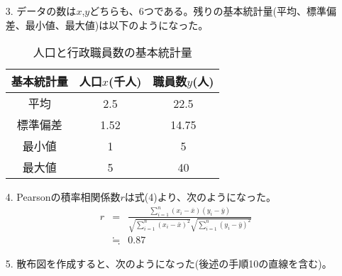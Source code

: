 \documentclass[12pt]{jarticle}
\begin{document}
\begin{itemize}
    \item [3.]データの数は$x$,$y$どちらも、6つである。残りの基本統計量(平均、標準偏差、最小値、最大値)は以下のようになった。
          \begin{table}[htb]
              \begin{center}
                  \caption{人口と行政職員数の基本統計量}
                  \begin{tabular}{|c|c|c|} \hline
                      基本統計量 & 人口$x$(千人) & 職員数$y$(人) \\ \hline
                      平均       & 2.5           & 22.5          \\
                      標準偏差   & 1.52          & 14.75         \\
                      最小値     & 1             & 5             \\
                      最大値     & 5             & 40            \\ \hline
                  \end{tabular}
              \end{center}
          \end{table}


    \item [4.]Pearsonの積率相関係数$r$は式(4)より、次のようになった。
          \begin{eqnarray}
              r&=&\frac{\sum_{i=1}^{n} (x_i-\bar{x})(y_i-\bar{y})}{\sqrt{\sum_{i=1}^{n} (x_i-\bar{x})^2} \sqrt{\sum_{i=1}^{n} (y_i-\bar{y})^2}} \nonumber\\
              &\fallingdotseq &0.87 \nonumber
          \end{eqnarray}

    \item [5.]散布図を作成すると、次のようになった(後述の手順10の直線を含む)。

          \clearpage


\end{itemize}
\end{document}
